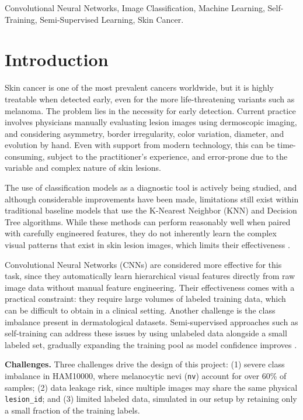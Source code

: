 \documentclass[conference]{IEEEtran}
\begin{document}
\begin{IEEEkeywords}
Convolutional Neural Networks, Image Classification, Machine Learning,
Self-Training, Semi-Supervised Learning, Skin Cancer.
\end{IEEEkeywords}

\section{Introduction}
Skin cancer is one of the most prevalent cancers worldwide, but it is
highly treatable when detected early, even for the more
life-threatening variants such as melanoma. The problem lies in the
necessity for early detection. Current practice involves physicians
manually evaluating lesion images using dermoscopic imaging, and
considering asymmetry, border irregularity, color variation, diameter,
and evolution by hand. Even with support from modern technology, this
can be time-consuming, subject to the practitioner's experience, and
error-prone due to the variable and complex nature of skin lesions.

The use of classification models as a diagnostic tool is actively
being studied, and although considerable improvements have been made,
limitations still exist within traditional baseline models that use
the K-Nearest Neighbor (KNN) and Decision Tree algorithms. While
these methods can perform reasonably well when paired with carefully
engineered features, they do not inherently learn the complex visual
patterns that exist in skin lesion images, which limits their
effectiveness \cite{wu2022skin}.

Convolutional Neural Networks (CNNs) are considered more effective
for this task, since they automatically learn hierarchical visual
features directly from raw image data without manual feature
engineering. Their effectiveness comes with a practical constraint:
they require large volumes of labeled training data, which can be
difficult to obtain in a clinical setting. Another challenge is the
class imbalance present in dermatological datasets. Semi-supervised
approaches such as self-training can address these issues by using
unlabeled data alongside a small labeled set, gradually expanding
the training pool as model confidence improves \cite{wu2022skin}.

\textbf{Challenges.} Three challenges drive the design of this project:
(1) severe class imbalance in HAM10000, where melanocytic nevi (\texttt{nv})
account for over 60\% of samples; (2) data leakage risk, since multiple
images may share the same physical \texttt{lesion\_id}; and (3) limited
labeled data, simulated in our setup by retaining only a small fraction
of the training labels.
\end{document}
